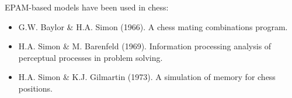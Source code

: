 \documentclass{article}
\begin{document}
\noindent EPAM-based models have been used in chess:

\begin{itemize}
\item G.W. Baylor \& H.A. Simon (1966). A chess mating combinations program.~\cite{Baylor66}
\item H.A. Simon \& M. Barenfeld (1969). Information processing analysis of perceptual processes in problem solving.\cite{Simon69b}
\item H.A. Simon \& K.J. Gilmartin (1973). A simulation of memory for 
chess positions.~\cite{Simon73}
\end{itemize}






\end{document}
